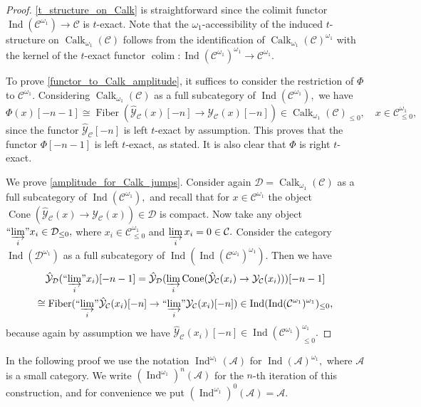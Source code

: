 \documentclass[11pt,leqno]{amsart}
\numberwithin{equation}{section}
\DeclareMathOperator*{\colim}{colim}
\newcommand{\indlim}[1][]{\mathop{\varinjlim}\limits_{#1}}
\newcommand{\inddlim}[1][]{{``{\indlim[#1]}"}}
\newcommand{\Cone}{\operatorname{Cone}}
\newcommand{\Fiber}{\operatorname{Fiber}}
\newcommand{\cD}{{\mathcal D}}
\newcommand{\cA}{{\mathcal A}}
\newcommand{\cC}{{\mathcal C}}
\newcommand{\cY}{{\mathcal Y}}
\newcommand{\Ind}{\operatorname{Ind}}
\newcommand{\Calk}{\operatorname{Calk}}
\begin{document}
\begin{proof} \ref{t_structure_on_Calk} is straightforward since the colimit functor $\Ind(\cC^{\omega_1})\to\cC$ is $t$-exact. Note that the $\omega_1$-accessibility of the induced $t$-structure on $\Calk_{\omega_1}(\cC)$ follows from the identification of $\Calk_{\omega_1}(\cC)^{\omega_1}$ with the kernel of the $t$-exact functor $\colim:\Ind(\cC^{\omega_1})^{\omega_1}\to\cC^{\omega_1}.$

To prove \ref{functor_to_Calk_amplitude}, it suffices to consider the restriction of $\Phi$ to $\cC^{\omega_1}.$ Considering $\Calk_{\omega_1}(\cC)$ as a full subcategory of $\Ind(\cC^{\omega_1}),$ we have
\begin{equation*}
\Phi(x)[-n-1]\cong \Fiber(\hat{\cY}_{\cC}(x)[-n]\to\cY_{\cC}(x)[-n])\in \Calk_{\omega_1}(\cC)_{\leq 0},\quad x\in\cC^{\omega_1}_{\leq 0},
\end{equation*}
since the functor $\hat{\cY}_{\cC}[-n]$ is left $t$-exact by assumption. This proves that the functor $\Phi[-n-1]$ is left $t$-exact, as stated. It is also clear that $\Phi$ is right $t$-exact.

We prove \ref{amplitude_for_Calk_jumps}. Consider again $\cD = \Calk_{\omega_1}(\cC)$ as a full subcategory of $\Ind(\cC^{\omega_1}),$ and recall that for $x\in\cC^{\omega_1}$ the object $\Cone(\hat{\cY}_{\cC}(x)\to\cY_{\cC}(x))\in\cD$ is compact. Now take any object $\inddlim[i]x_i\in\cD_{\leq 0},$ where $x_i\in\cC^{\omega_1}_{\leq 0}$ and $\indlim[i]x_i = 0\in\cC.$ Consider the category $\Ind(\cD^{\omega_1})$ as a full subcategory of $\Ind(\Ind(\cC^{\omega_1})^{\omega_1}).$ Then we have
\begin{multline*}
\hat{\cY}_{\cD}(\inddlim[i]x_i)[-n-1]=\hat{\cY}_{\cD}(\indlim[i]\Cone(\hat{\cY}_{\cC}(x_i)\to\cY_{\cC}(x_i)))[-n-1]\\
\cong\Fiber(\inddlim[i]\hat{\cY}_{\cC}(x_i)[-n]\to \inddlim[i]\cY_{\cC}(x_i)[-n])\in \Ind(\Ind(\cC^{\omega_1})^{\omega_1})_{\leq 0},
\end{multline*}
because again by assumption we have $\hat{\cY}_{\cC}(x_i)[-n]\in\Ind(\cC^{\omega_1})^{\omega_1}_{\leq 0}.$
\end{proof}

In the following proof we use the notation $\Ind^{\omega_1}(\cA)$ for $\Ind(\cA)^{\omega_1},$ where $\cA$ is a small category. We write $(\Ind^{\omega_1})^n(\cA)$ for the $n$-th iteration of this construction, and for convenience we put $(\Ind^{\omega_1})^0(\cA)=\cA.$ 
\end{document}
